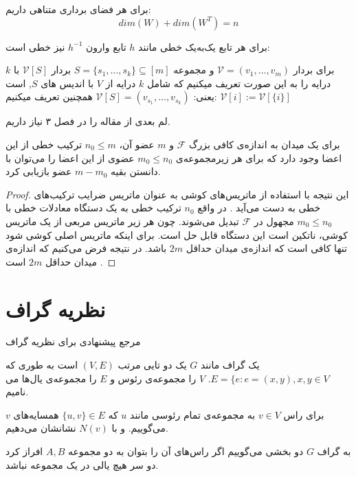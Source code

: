 \begin{theorem}
	برای هر فضای برداری متناهی داریم:
	$$dim(W) + dim(W^T) = n$$
\end{theorem}
\begin{remark}
	برای هر تابع یک‌به‌یک خطی مانند
	$h$
	تابع وارون 
	$h^{-1}$
	نیز خطی است:
\end{remark}

برای بردار
$\mathcal{V} = (v_1, \ldots, v_m)$ 
و مجموعه
$S = \{s_1, \ldots, s_k\} \subseteq [m]$
بردار
$\mathcal{V} [S]$ 
با 
$k$
درایه را به این صورت تعریف میکنیم که شامل 
$k$ 
درایه از
$V$ 
با اندیس های
$S$, 
است یعنی:
$\mathcal{V} [S] = (v_{s_1}, \ldots, v_{s_k})$
همچنین تعریف میکنیم:
$\mathcal{V} [i] := \mathcal{V} [{\{i\}}]$

لم بعدی از مقاله
\cite{pliable2015paper}
را در فصل ۳ نیاز داریم.
\begin{lemma}
	\label{lemma:pliable20151}
	برای یک میدان به اندازه‌ی کافی بزرگ
	$\mathcal{F}$
	و
	$m$
	عضو آن،
	$n_0 \leq m$
	ترکیب خطی از این اعضا وجود دارد که برای هر زیرمجموعه‌ی
	$m_0 \leq n_0$
	عضوی از این اعضا را می‌توان با دانستن بقیه
	$m - m_0$
	عضو بازیابی کرد.
\end{lemma}
\begin{proof}
این نتیجه با استفاده از ماتریس‌های کوشی به عنوان ماتریس ضرایب ترکیب‌های خطی به دست می‌آید
\cite{Blmer1995AnXE}
. در واقع
$n_0$
ترکیب خطی به یک دستگاه معادلات خطی با
$m_0 \leq n_0$
مجهول در
$\mathcal{F}$
تبدیل می‌شوند. چون هر زیر ماتریس مربعی از یک ماتریس کوشی، ناتکین است این دستگاه قابل حل است. برای اینکه ماتریس اصلی کوشی شود تنها کافی است که اندازه‌ی میدان حداقل
$2m$
باشد. در نتیجه فرض می‌کنیم که اندازه‌ی میدان حداقل
$2m$
است
\cite{pliable2015paper}.
\end{proof}
\section{نظریه گراف}
مرجع پیشنهادی برای نظریه گراف
\cite{west}
\begin{definition}
یک گراف مانند
$G$
یک دو تایی مرتب
$(V, E)$
است به طوری که
$E = \{e: e = (x, y), x, y \in V$.
 $V$
را مجموعه‌ی رئوس و
$E$
را مجموعه‌ی یال‌ها می نامیم.

برای راس
$v\in V$
به مجمو‌عه‌ی تمام رئوسی مانند
  $u$ 
  که
  $\{u,v\}\in E$ 
  همسایه‌های 
  $v$
  می‌گوییم.
  و با
  $N(v)$
  نشانشان می‌دهیم.
  
به گراف
$G$
دو بخشی می‌گوییم اگر راس‌های آن را بتوان به دو مجموعه 
$A, B$
افراز کرد دو سر هیچ یالی در یک مجموعه نباشد.
\end{definition}

